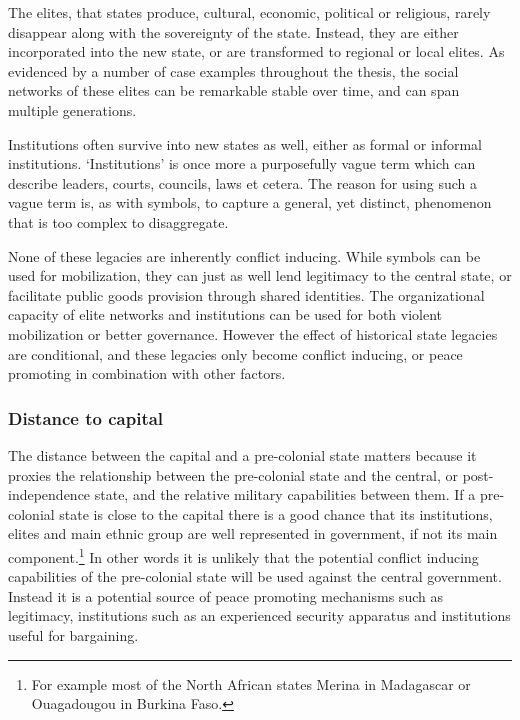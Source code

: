 The elites, that states produce, cultural, economic, political or religious,
rarely disappear along with the sovereignty of the state. Instead, they are
either incorporated into the new state, or are transformed to regional or
local elites. As evidenced by a number of case examples throughout the thesis,
the social networks of these elites can be remarkable stable over time, and can
span multiple generations.

Institutions often survive into new states as well, either as formal or informal
institutions. `Institutions' is once more a purposefully vague term which can
describe leaders, courts, councils, laws et cetera. The reason for using such a
vague term is, as with symbols, to capture a general, yet distinct, phenomenon
that is too complex to disaggregate.

None of these legacies are inherently conflict inducing. While symbols can be
used for mobilization, they can just as well lend legitimacy to the central
state, or facilitate public goods provision through shared identities. The
organizational capacity of elite networks and institutions can be used for both
violent mobilization or better governance. However the effect of historical
state legacies are conditional, and these legacies only become conflict
inducing, or peace promoting in combination with other factors.

\subsubsection{Distance to capital} \label{dtc}

The distance between the capital and a pre-colonial state matters because it
proxies the relationship between the pre-colonial state and the central, or
post-independence state, and the relative military capabilities between them. If
a pre-colonial state is close to the capital there is a good chance that its
institutions, elites and main ethnic group are well represented in government,
if not its main component.\footnote{For example most of the North African states
Merina in Madagascar or Ouagadougou in Burkina Faso.} In other words it is
unlikely that the potential conflict inducing capabilities of the pre-colonial
state will be used against the central government. Instead it is a potential
source of peace promoting mechanisms such as legitimacy, institutions such as an
experienced security apparatus and institutions useful for bargaining.


